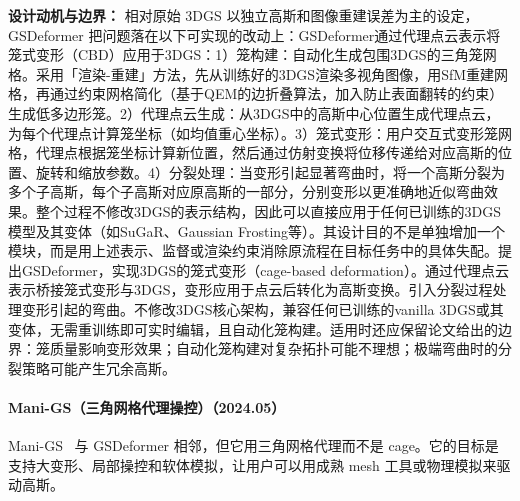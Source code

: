 \textbf{设计动机与边界：} 相对原始 3DGS 以独立高斯和图像重建误差为主的设定，GSDeformer 把问题落在以下可实现的改动上：GSDeformer通过代理点云表示将笼式变形（CBD）应用于3DGS：1）笼构建：自动化生成包围3DGS的三角笼网格。采用「渲染-重建」方法，先从训练好的3DGS渲染多视角图像，用SfM重建网格，再通过约束网格简化（基于QEM的边折叠算法，加入防止表面翻转的约束）生成低多边形笼。2）代理点云生成：从3DGS中的高斯中心位置生成代理点云，为每个代理点计算笼坐标（如均值重心坐标）。3）笼式变形：用户交互式变形笼网格，代理点根据笼坐标计算新位置，然后通过仿射变换将位移传递给对应高斯的位置、旋转和缩放参数。4）分裂处理：当变形引起显著弯曲时，将一个高斯分裂为多个子高斯，每个子高斯对应原高斯的一部分，分别变形以更准确地近似弯曲效果。整个过程不修改3DGS的表示结构，因此可以直接应用于任何已训练的3DGS模型及其变体（如SuGaR、Gaussian Frosting等）。其设计目的不是单独增加一个模块，而是用上述表示、监督或渲染约束消除原流程在目标任务中的具体失配。提出GSDeformer，实现3DGS的笼式变形（cage-based deformation）。通过代理点云表示桥接笼式变形与3DGS，变形应用于点云后转化为高斯变换。引入分裂过程处理变形引起的弯曲。不修改3DGS核心架构，兼容任何已训练的vanilla 3DGS或其变体，无需重训练即可实时编辑，且自动化笼构建。适用时还应保留论文给出的边界：笼质量影响变形效果；自动化笼构建对复杂拓扑可能不理想；极端弯曲时的分裂策略可能产生冗余高斯。
\paragraph{Mani-GS（三角网格代理操控）（2024.05）}
Mani-GS~\cite{2405_17811} 与 GSDeformer 相邻，但它用三角网格代理而不是 cage。它的目标是支持大变形、局部操控和软体模拟，让用户可以用成熟 mesh 工具或物理模拟来驱动高斯。

